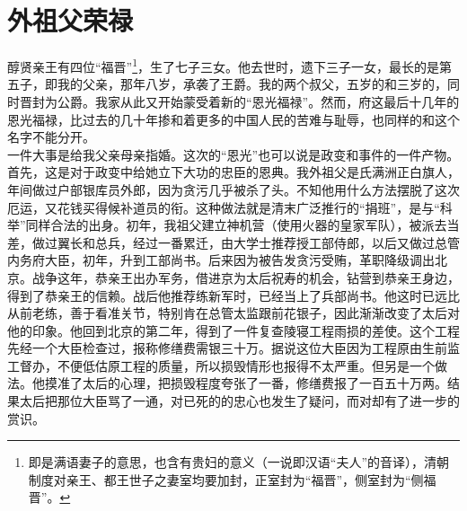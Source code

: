 \fancyhead[RO]{} %
\fancyhead[LE]{} %
\chapter*{外祖父荣禄}
\thispagestyle{empty}
醇贤亲王有四位“福晋”\footnote{即是满语妻子的意思，也含有贵妇的意义（一说即汉语“夫人”的音译），清朝制度对亲王、都王世子之妻室均要加封，正室封为“福晋”，侧室封为“侧福晋”。}，生了七子三女。他去世时，遗下三子一女，最长的是第五子，即我的父亲，那年八岁，承袭了王爵。我的两个叔父，五岁的和三岁的，同时晋封为公爵。我家从此又开始蒙受着新的“恩光福禄”。然而，府这最后十几年的恩光福禄，比过去的几十年掺和着更多的中国人民的苦难与耻辱，也同样的和这个名字不能分开。\\

  一件大事是给我父亲母亲指婚。这次的“恩光”也可以说是政变和事件的一件产物。首先，这是对于政变中给她立下大功的忠臣的恩典。我外祖父是氏满洲正白旗人，年间做过户部银库员外郎，因为贪污几乎被杀了头。不知他用什么方法摆脱了这次厄运，又花钱买得候补道员的衔。这种做法就是清末广泛推行的“捐班”，是与“科举”同样合法的出身。初年，我祖父建立神机营（使用火器的皇家军队），被派去当差，做过翼长和总兵，经过一番累迁，由大学士推荐授工部侍郎，以后又做过总管内务府大臣，初年，升到工部尚书。后来因为被告发贪污受贿，革职降级调出北京。战争这年，恭亲王出办军务，借进京为太后祝寿的机会，钻营到恭亲王身边，得到了恭亲王的信赖。战后他推荐练新军时，已经当上了兵部尚书。他这时已远比从前老练，善于看准关节，特别肯在总管太监跟前花银子，因此渐渐改变了太后对他的印象。他回到北京的第二年，得到了一件复查陵寝工程雨损的差使。这个工程先经一个大臣检查过，报称修缮费需银三十万。据说这位大臣因为工程原由生前监工督办，不便低估原工程的质量，所以损毁情形也报得不太严重。但另是一个做法。他摸准了太后的心理，把损毁程度夸张了一番，修缮费报了一百五十万两。结果太后把那位大臣骂了一通，对已死的的忠心也发生了疑问，而对却有了进一步的赏识。\\

